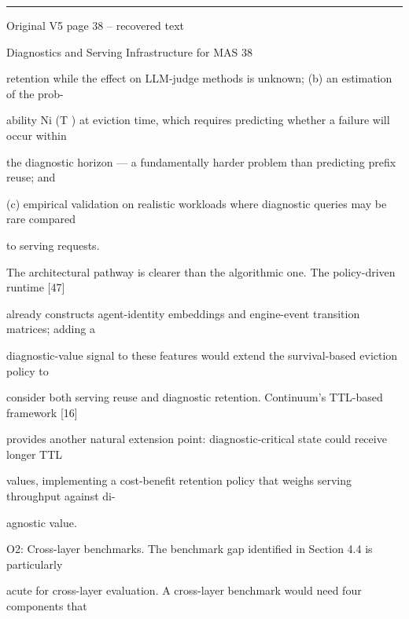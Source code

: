 \par\smallskip\noindent\rule{\textwidth}{0.4pt}\par{\sffamily\footnotesize Original V5 page 38 -- recovered text}\par\begin{flushleft}\footnotesize\ttfamily
\par\smallskip
\par\smallskip
\noindent Diagnostics and Serving Infrastructure for MAS 38\par
\par\smallskip
\par\smallskip
\par\smallskip
\noindent retention while the effect on LLM-judge methods is unknown; (b) an estimation of the prob-\par
\noindent ability Ni (T ) at eviction time, which requires predicting whether a failure will occur within\par
\noindent the diagnostic horizon — a fundamentally harder problem than predicting prefix reuse; and\par
\noindent (c) empirical validation on realistic workloads where diagnostic queries may be rare compared\par
\noindent to serving requests.\par
\noindent  The architectural pathway is clearer than the algorithmic one. The policy-driven runtime [47]\par
\noindent already constructs agent-identity embeddings and engine-event transition matrices; adding a\par
\noindent diagnostic-value signal to these features would extend the survival-based eviction policy to\par
\noindent consider both serving reuse and diagnostic retention. Continuum’s TTL-based framework [16]\par
\noindent provides another natural extension point: diagnostic-critical state could receive longer TTL\par
\noindent values, implementing a cost-benefit retention policy that weighs serving throughput against di-\par
\noindent agnostic value.\par
\par\smallskip
\noindent O2: Cross-layer benchmarks. The benchmark gap identified in Section 4.4 is particularly\par
\noindent acute for cross-layer evaluation. A cross-layer benchmark would need four components that\par

\end{flushleft}
